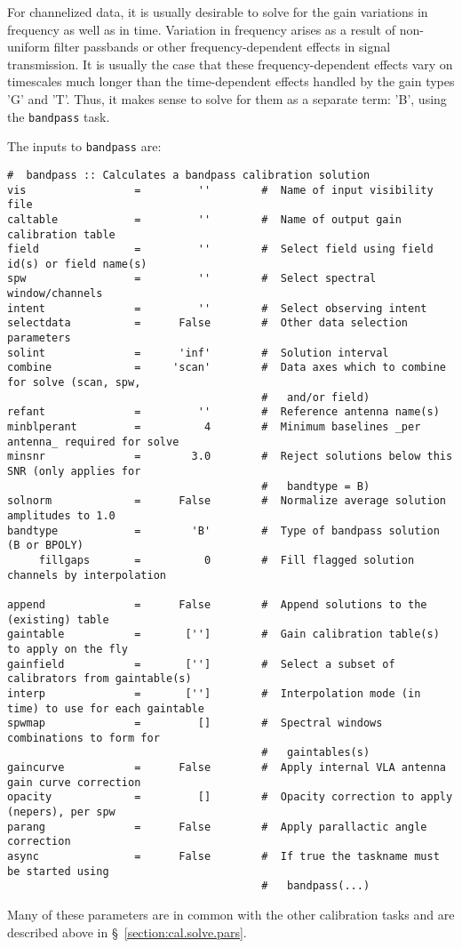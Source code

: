 For channelized data, it is usually desirable to solve for the gain
variations in frequency as well as in time.  Variation in frequency
arises as a result of non-uniform filter passbands or other frequency-dependent
effects in signal transmission.  It is usually the case that these
frequency-dependent effects vary on timescales much longer than the
time-dependent effects handled by the gain types 'G' and 'T'.  
Thus, it makes sense to solve for them as a separate term: 'B', using the
{\tt bandpass} task.

The inputs to {\tt bandpass} are:
\small
\begin{verbatim}
#  bandpass :: Calculates a bandpass calibration solution
vis                 =         ''        #  Name of input visibility file
caltable            =         ''        #  Name of output gain calibration table
field               =         ''        #  Select field using field id(s) or field name(s)
spw                 =         ''        #  Select spectral window/channels
intent              =         ''        #  Select observing intent
selectdata          =      False        #  Other data selection parameters
solint              =      'inf'        #  Solution interval
combine             =     'scan'        #  Data axes which to combine for solve (scan, spw,
                                        #   and/or field)
refant              =         ''        #  Reference antenna name(s)
minblperant         =          4        #  Minimum baselines _per antenna_ required for solve
minsnr              =        3.0        #  Reject solutions below this SNR (only applies for
                                        #   bandtype = B)
solnorm             =      False        #  Normalize average solution amplitudes to 1.0
bandtype            =        'B'        #  Type of bandpass solution (B or BPOLY)
     fillgaps       =          0        #  Fill flagged solution channels by interpolation

append              =      False        #  Append solutions to the (existing) table
gaintable           =       ['']        #  Gain calibration table(s) to apply on the fly
gainfield           =       ['']        #  Select a subset of calibrators from gaintable(s)
interp              =       ['']        #  Interpolation mode (in time) to use for each gaintable
spwmap              =         []        #  Spectral windows combinations to form for
                                        #   gaintables(s)
gaincurve           =      False        #  Apply internal VLA antenna gain curve correction
opacity             =         []        #  Opacity correction to apply (nepers), per spw
parang              =      False        #  Apply parallactic angle correction
async               =      False        #  If true the taskname must be started using
                                        #   bandpass(...)
\end{verbatim}
\normalsize
Many of these parameters are in common with the other calibration
tasks and are described above in \S~\ref{section:cal.solve.pars}.


